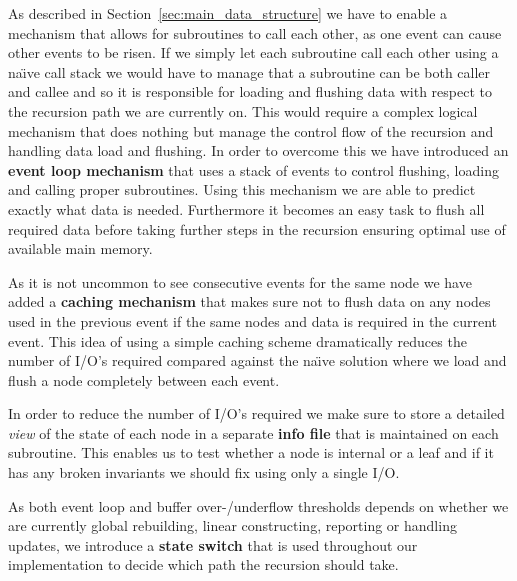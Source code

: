 \documentclass[twoside,11pt,openright]{report}
\begin{document}
As described in Section~\ref{sec:main_data_structure} we have to enable a mechanism that allows for subroutines to call each other, as one event can cause other events to be risen. If we simply let each subroutine call each other using a na\"{\i}ve call stack we would have to manage that a subroutine can be both caller and callee and so it is responsible for loading and flushing data with respect to the recursion path we are currently on. This would require a complex logical mechanism that does nothing but manage the control flow of the recursion and handling data load and flushing. In order to overcome this we have introduced an \textbf{event loop mechanism} that uses a stack of events to control flushing, loading and calling  proper subroutines. Using this mechanism we are able to predict exactly what data is needed. Furthermore it becomes an easy task to flush all required data before taking further steps in the recursion ensuring optimal use of available main memory.

As it is not uncommon to see consecutive events for the same node we have added a \textbf{caching mechanism} that makes sure not to flush data on any nodes used in the previous event if the same nodes and data is required in the current event. This idea of using a simple caching scheme dramatically reduces the number of I/O's required compared against the na\"{\i}ve solution where we load and flush a node completely between each event.

In order to reduce the number of I/O's required we make sure to store a detailed \textit{view} of the state of each node in a separate \textbf{info file} that is maintained on each subroutine. This enables us to test whether a node is internal or a leaf and if it has any broken invariants we should fix using only a single I/O.

As both event loop and buffer over-/underflow thresholds depends on whether we are currently global rebuilding, linear constructing, reporting or handling updates, we introduce a \textbf{state switch} that is used throughout our implementation to decide which path the recursion should take.
\end{document}
